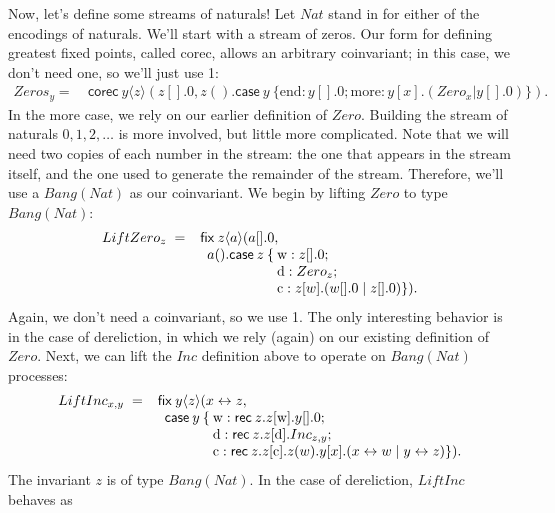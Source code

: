 \documentclass[orivec,envcountsame]{llncs}
\newcommand{\mkwd}[1]{\mathsf{#1}}
\newcommand{\tkwd}[1]{\textsf{#1}}
\newcommand{\link}[2]{#1 \leftrightarrow #2}
\newcommand{\rec}[1]{\mkwd{rec}\:#1}
\newcommand{\corec}[5]{\mkwd{corec}\:#1 \langle #2 \rangle (#4,#5)}
\newcommand{\clabel}[1]{\mathrm{#1}}
\renewcommand{\case}[2]{\mkwd{case}\:#1\:\{#2\}}
\newcommand{\sel}[2]{#1[\clabel{#2}]}
\newcommand{\lrkwd}{\mkwd{fix}}
\begin{document}
Now, let's define some streams of naturals!  Let $Nat$ stand in for either of the encodings of
naturals.  We'll start with a stream of zeros.  Our form for defining greatest fixed points, called
\tkwd{corec}, allows an arbitrary coinvariant; in this case, we don't need one, so we'll just use 1:
%
{\small\begin{align*}
  Zeros_y =\ &\corec{y}{z}{1}{z[].0}{z().\case{y}{\clabel{end}: y[].0; \clabel{more}: y[x].(Zero_x | y[].0)}}.
\end{align*}}
%
In the \textrm{more} case, we rely on our earlier definition of $Zero$.  Building the stream of
naturals $0,1,2,\dots$ is more involved, but little more complicated. Note that we will need two
copies of each number in the stream: the one that appears in the stream itself, and the one used to
generate the remainder of the stream.  Therefore, we'll use a $Bang(Nat)$ as our coinvariant.  We
begin by lifting $Zero$ to type $Bang(Nat)$:
%
{\small\[\begin{array}{r@{\hspace{2mm}}c@{\hspace{2mm}}l@{\hspace{0mm}}l@{\:}l}
  LiftZero_z & = & \mcl{3}{\lrkwd \: z \langle a \rangle (a[].0,} \\
  & & \quad & a().\mkwd{case}\: z \: \{ &\clabel{w}: z[].0; \\
  & & & & \clabel{d}: Zero_z; \\
  & & & & \clabel{c}: z[w].(w[].0 \mid z[].0) \}).
\end{array}\]}
%
Again, we don't need a coinvariant, so we use 1.  The only interesting behavior is in the case of
dereliction, in which we rely (again) on our existing definition of $Zero$.  Next, we can lift the
$Inc$ definition above to operate on $Bang(Nat)$ processes:
%
{\small\[\begin{array}{r@{\hspace{2mm}}c@{\hspace{2mm}}l@{\hspace{0mm}}l@{\:}l}
  LiftInc_{x,y} & = & \mcl{3}{\lrkwd \: y \langle z \rangle (\link{x}{z},} \\
  & & \quad & \mkwd{case} \: y \: \{ & \clabel{w}: \rec{z}.\sel{z}{w}.y[].0; \\
  & & & & \clabel{d}: \rec{z}.\sel{z}{d}.Inc_{z,y}; \\
  & & & & \clabel{c}: \rec{z}.\sel{z}{c}.z(w).y[x].(\link{x}{w} \mid \link{y}{z}) \}).
\end{array}\]}
%
The invariant $z$ is of type $Bang(Nat)$.  In the case of dereliction, $LiftInc$ behaves as
\end{document}
